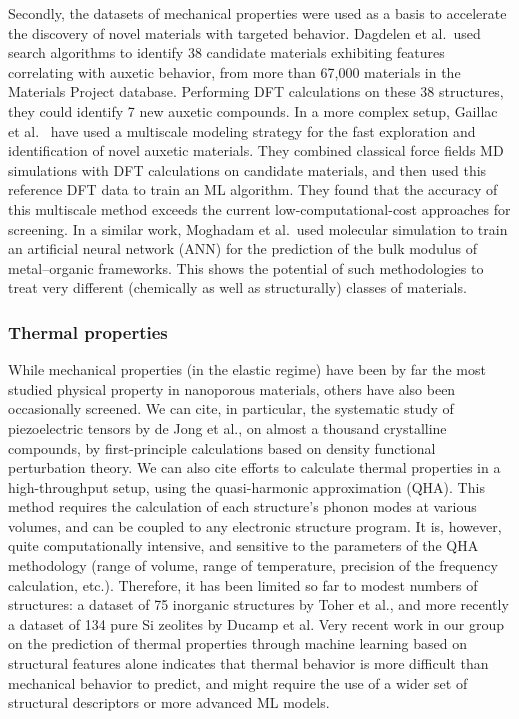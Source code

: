 \documentclass[main.tex]{subfiles}
\begin{document}
Secondly, the datasets of mechanical properties were used as a basis to accelerate the discovery of novel materials with targeted behavior. Dagdelen et al.\ used search algorithms to identify 38 candidate materials exhibiting features correlating with auxetic behavior, from more than 67,000 materials in the Materials Project database.\autocite{Dagdelen_2017} Performing DFT calculations on these 38 structures, they could identify 7 new auxetic compounds. In a more complex setup, Gaillac et al.~\autocite{Gaillac_2020} have used a multiscale modeling strategy for the fast exploration and identification of novel auxetic materials. They combined classical force fields MD simulations with DFT calculations on candidate materials, and then used this reference DFT data to train an ML algorithm. They found that the accuracy of this multiscale method exceeds the current low-computational-cost approaches for screening. In a similar work, Moghadam et al.\ used molecular simulation to train an artificial neural network (ANN) for the prediction of the bulk modulus of metal--organic frameworks.\autocite{Moghadam_2019} This shows the potential of such methodologies to treat very different (chemically as well as structurally) classes of materials.

\subsubsection{Thermal properties}

While mechanical properties (in the elastic regime) have been by far the most studied physical property in nanoporous materials, others have also been occasionally screened. We can cite, in particular, the systematic study of piezoelectric tensors by de Jong et al., on almost a thousand crystalline compounds, by first-principle calculations based on density functional perturbation theory.\autocite{deJong2015_piezo} We can also cite efforts to calculate thermal properties in a high-throughput setup, using the quasi-harmonic approximation (QHA).\autocite{Togo_2010} This method requires the calculation of each structure's phonon modes at various volumes, and can be coupled to any electronic structure program.\autocite{Togo_2015} It is, however, quite computationally intensive, and sensitive to the parameters of the QHA methodology (range of volume, range of temperature, precision of the frequency calculation, etc.). Therefore, it has been limited so far to modest numbers of structures: a dataset of 75 inorganic structures by Toher et al.,\autocite{Toher_2014} and more recently a dataset of 134 pure Si zeolites by Ducamp et al.\autocite{Ducamp_2021} Very recent work in our group on the prediction of thermal properties through machine learning based on structural features alone indicates that thermal behavior is more difficult than mechanical behavior to predict, and might require the use of a wider set of structural descriptors or more advanced ML models.\autocite{Ducamp_2022}
\end{document}
